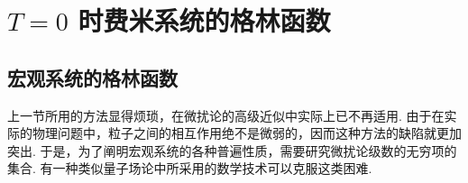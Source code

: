 %
%

\chapter{\texorpdfstring{$T=0$}{T=0} 时费米系统的格林函数}

\section{宏观系统的格林函数}

上一节所用的方法显得烦琐，在微扰论的高级近似中实际上已不再适用. 由于在实际的物理问题中，粒子之间的相互作用绝不是微弱的，因而这种方法的缺陷就更加突出. 于是，为了阐明宏观系统的各种普遍性质，需要研究微扰论级数的无穷项的集合. 有一种类似量子场论中所采用的数学技术可以克服这类困难.


